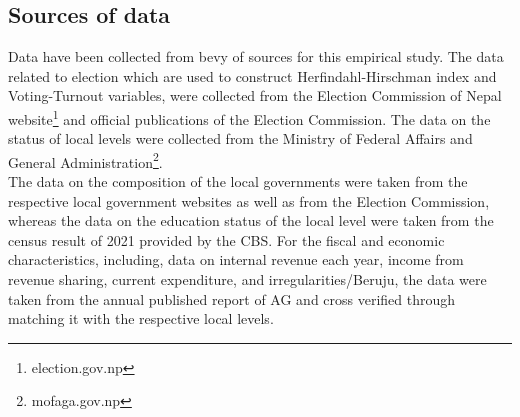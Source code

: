 \subsection{Sources of data}
Data have been collected from bevy of sources for this empirical study. The data related to election which are used to construct Herfindahl-Hirschman index and Voting-Turnout variables, were collected from the Election Commission of Nepal website\footnote{election.gov.np} and official publications of the Election Commission. The data on the status of local levels were collected from the Ministry of Federal Affairs and General Administration\footnote{mofaga.gov.np}.  \\
The data on the composition of the local governments were taken from the respective local government websites as well as from the Election Commission, whereas the data on the education status of the local level were taken from the census result of 2021 provided by the CBS. For the fiscal and economic characteristics, including, data on internal revenue each year, income from revenue sharing, current expenditure, and irregularities/Beruju, the data were taken from the annual published report of AG and cross verified through matching it with the respective local levels.
\vspace{-5mm}
